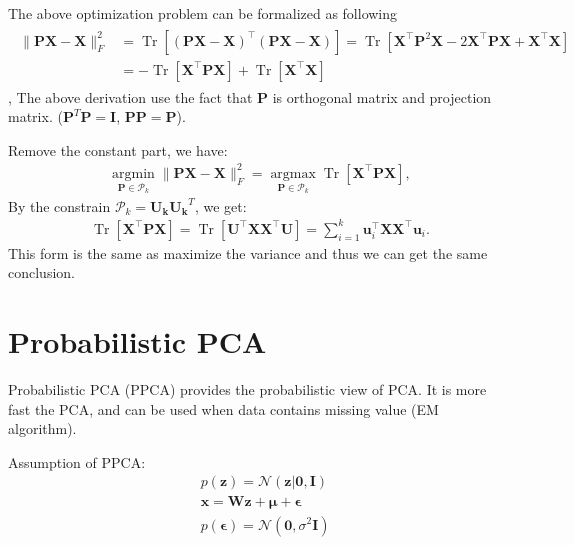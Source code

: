 \documentclass{article}
\begin{document}
The above optimization problem can be formalized as following
\begin{align*}
\begin{aligned}\|\mathbf{P} \mathbf{X}-\mathbf{X}\|_{F}^{2} &=\operatorname{Tr}\left[(\mathbf{P} \mathbf{X}-\mathbf{X})^{\top}(\mathbf{P} \mathbf{X}-\mathbf{X})\right]=\operatorname{Tr}\left[\mathbf{X}^{\top} \mathbf{P}^{2} \mathbf{X}-2 \mathbf{X}^{\top} \mathbf{P} \mathbf{X}+\mathbf{X}^{\top} \mathbf{X}\right] \\ &=-\operatorname{Tr}\left[\mathbf{X}^{\top} \mathbf{P} \mathbf{X}\right]+\operatorname{Tr}\left[\mathbf{X}^{\top} \mathbf{X}\right] \end{aligned}
\end{align*},
The above derivation use the fact that $\mathbf{P}$ is orthogonal matrix and projection matrix. ($\mathbf{P}^{T}\mathbf{P}=\mathbf{I}$, $\mathbf{PP} = \mathbf{P}$).

Remove the constant part, we have:
\begin{align*}
\underset{\mathbf{P} \in \mathcal{P}_{k}}{\operatorname{argmin}}\|\mathbf{P} \mathbf{X}-\mathbf{X}\|_{F}^{2}=\underset{\mathbf{P} \in \mathcal{P}_{k}}{\operatorname{argmax}} \operatorname{Tr}\left[\mathbf{X}^{\top} \mathbf{P X}\right],
\end{align*}
By the constrain $\mathcal{P}_{k}  = \mathbf{U_k}\mathbf{U_k}^{T}$, we get:
\begin{align*}
\operatorname{Tr}\left[\mathbf{X}^{\top} \mathbf{P X}\right]=\operatorname{Tr}\left[\mathbf{U}^{\top} \mathbf{X} \mathbf{X}^{\top} \mathbf{U}\right]=\sum_{i=1}^{k} \mathbf{u}_{i}^{\top} \mathbf{X} \mathbf{X}^{\top} \mathbf{u}_{i}.
\end{align*}
This form is the same as maximize the variance and thus we can get the same conclusion.

\section{Probabilistic PCA}
Probabilistic PCA (PPCA) provides the probabilistic view of PCA. It is more fast the PCA, and can be used when data contains missing value (EM algorithm).

Assumption of PPCA:
\begin{align*}
&p(\mathbf{z})=\mathcal{N}(\mathbf{z} | \mathbf{0}, \mathbf{I})\\
&\mathbf{x}=\mathbf{W} \mathbf{z}+\boldsymbol{\mu}+\boldsymbol{\epsilon}\\
&p(\boldsymbol{\epsilon})=\mathcal{N}\left(\mathbf{0}, \sigma^2\mathbf{I}\right)
\end{align*}
\end{document}
